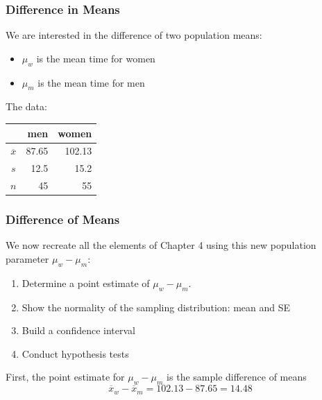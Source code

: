 \documentclass[slides]{beamer}
\newcommand{\blue}[1]{\textcolor{blue2}{#1}}
\newcommand{\xbar}{\overline{x}}
\begin{document}
\begin{frame}[fragile]
\frametitle{Difference in Means}
We are interested in the difference of two population means:
\pause\begin{itemize}
\item $\mu_w$ is the mean time for women
\item $\mu_m$ is the mean time for men
\end{itemize}

\pause\vspace{0.5cm}
The data:
\begin{center}
  \begin{tabular}{c|rr}
     & men & women \\ 
\hline
    $\overline{x}$ & 87.65 & 102.13 \\ 
    $s$ & 12.5 & 15.2 \\ 
    $n$ & 45 & 55 \\ 
\end{tabular}
\end{center}

\end{frame}


\begin{frame}[fragile]
\frametitle{Difference of Means}
We now recreate all the elements of Chapter 4 using this new \blue{population parameter}  $\mu_w - \mu_m$:

\vspace{0.25cm}

\begin{enumerate}
\pause\item Determine a point estimate of $\mu_w - \mu_m$.
\pause\item Show the normality of the sampling distribution:  mean and SE
\pause\item Build a confidence interval
\pause\item Conduct hypothesis tests
\end{enumerate}

\vspace{0.25cm}

\pause First, the \blue{point estimate} for $\mu_w - \mu_m$ is the \blue{sample difference of means}
\[\xbar_w - \xbar_m = 102.13-87.65=14.48\]



\end{frame}
\end{document}
